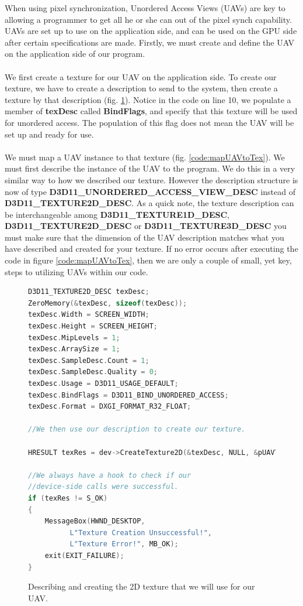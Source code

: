 \documentclass[a4paper, 12pt]{article}
\begin{document}
When using pixel synchronization, Unordered Access Views (UAVs) are key to
allowing a programmer to get all he or she can out of the pixel synch
capability. UAVs are set up to use on the application side, and can be used on
the GPU side after certain specifications are made. Firstly, we must create
and define the UAV on the application side of our program. \\ \\ We first
create a texture for our UAV on the application side. To create our texture,
we have to create a description to send to the system, then create a texture
by that description (fig. \ref{code:texDesc}). Notice in the code on line 10,
we populate a member of \textbf{texDesc} called \textbf{BindFlags}, and
specify that this texture will be used for unordered access. The population of
this flag does not mean the UAV will be set up and ready for use. \\ \\ We
must map a UAV instance to that texture (fig. \ref{code:mapUAVtoTex}). We must
first describe the instance of the UAV to the program. We do this in a very
similar way to how we described our texture. However the description structure
is now of type \textbf{D3D11\_UNORDERED\_ACCESS\_VIEW\_DESC} instead of
\textbf{D3D11\_TEXTURE2D\_DESC}. As a quick note, the texture description can
be interchangeable among \textbf{D3D11\_TEXTURE1D\_DESC},
\textbf{D3D11\_TEXTURE2D\_DESC} or \textbf{D3D11\_TEXTURE3D\_DESC}\; you must
make sure that the dimension of the UAV description matches what you have
described and created for your texture. If no error occurs after executing the
code in figure \ref{code:mapUAVtoTex}, then we are only a couple of small, yet
key, steps to utilizing UAVs within our code.

\begin{figure}[h]
\begin{lstlisting}[language=C++,breaklines=true]
D3D11_TEXTURE2D_DESC texDesc;
ZeroMemory(&texDesc, sizeof(texDesc));
texDesc.Width = SCREEN_WIDTH;
texDesc.Height = SCREEN_HEIGHT;
texDesc.MipLevels = 1;
texDesc.ArraySize = 1;
texDesc.SampleDesc.Count = 1;
texDesc.SampleDesc.Quality = 0;
texDesc.Usage = D3D11_USAGE_DEFAULT;
texDesc.BindFlags = D3D11_BIND_UNORDERED_ACCESS;
texDesc.Format = DXGI_FORMAT_R32_FLOAT;

//We then use our description to create our texture.

HRESULT texRes = dev->CreateTexture2D(&texDesc, NULL, &pUAVTex);

//We always have a hook to check if our 
//device-side calls were successful.
if (texRes != S_OK)
{
	MessageBox(HWND_DESKTOP, 
		  L"Texture Creation Unsuccessful!", 
		  L"Texture Error!", MB_OK);
	exit(EXIT_FAILURE);
}

\end{lstlisting}
\caption{Describing and creating the 2D texture that we will use for our UAV.}
\label{code:texDesc}
\end{figure}
\end{document}
